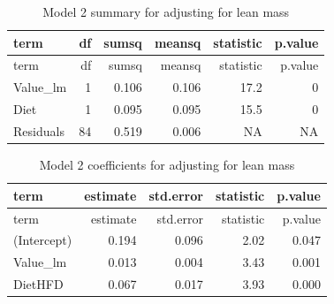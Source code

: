 \documentclass[]{article}
\newenvironment{Shaded}{\begin{snugshade}}{\end{snugshade}}
\newcommand{\DataTypeTok}[1]{\textcolor[rgb]{0.13,0.29,0.53}{#1}}
\newcommand{\FloatTok}[1]{\textcolor[rgb]{0.00,0.00,0.81}{#1}}
\newcommand{\KeywordTok}[1]{\textcolor[rgb]{0.13,0.29,0.53}{\textbf{#1}}}
\newcommand{\NormalTok}[1]{#1}
\newcommand{\OperatorTok}[1]{\textcolor[rgb]{0.81,0.36,0.00}{\textbf{#1}}}
\newcommand{\StringTok}[1]{\textcolor[rgb]{0.31,0.60,0.02}{#1}}
\begin{document}
\begin{Shaded}
\end{Shaded}

\begin{longtable}[]{@{}lrrrrr@{}}
\caption{Model 2 summary for adjusting for lean mass}\tabularnewline
\toprule
term & df & sumsq & meansq & statistic & p.value\tabularnewline
\midrule
\endfirsthead
\toprule
term & df & sumsq & meansq & statistic & p.value\tabularnewline
\midrule
\endhead
Value\_lm & 1 & 0.106 & 0.106 & 17.2 & 0\tabularnewline
Diet & 1 & 0.095 & 0.095 & 15.5 & 0\tabularnewline
Residuals & 84 & 0.519 & 0.006 & NA & NA\tabularnewline
\bottomrule
\end{longtable}

\begin{Shaded}
\end{Shaded}

\begin{longtable}[]{@{}lrrrr@{}}
\caption{Model 2 coefficients for adjusting for lean
mass}\tabularnewline
\toprule
term & estimate & std.error & statistic & p.value\tabularnewline
\midrule
\endfirsthead
\toprule
term & estimate & std.error & statistic & p.value\tabularnewline
\midrule
\endhead
(Intercept) & 0.194 & 0.096 & 2.02 & 0.047\tabularnewline
Value\_lm & 0.013 & 0.004 & 3.43 & 0.001\tabularnewline
DietHFD & 0.067 & 0.017 & 3.93 & 0.000\tabularnewline
\bottomrule
\end{longtable}
\end{document}
